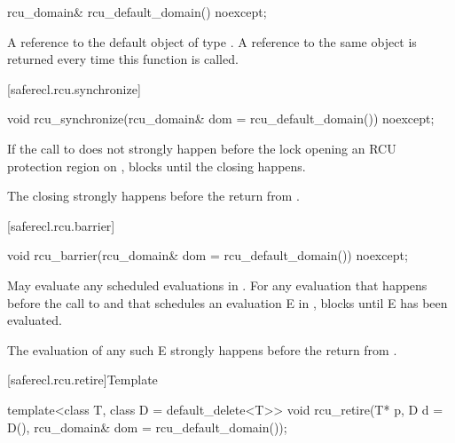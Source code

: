 \begin{itemdecl}
rcu_domain& rcu_default_domain() noexcept;
\end{itemdecl}

\begin{itemdescr}

\returns
A reference to the default object of type .
A reference to the same object is returned every time this
function is called.

\end{itemdescr}

[saferecl.rcu.synchronize]{}

\begin{itemdecl}
void rcu_synchronize(rcu_domain& dom = rcu_default_domain()) noexcept;
\end{itemdecl}

\begin{itemdescr}

\effects
If the call to  does not strongly
happen before the lock opening an RCU protection region 
on , blocks until the  closing 
happens.

\sync
The  closing  strongly
happens before the return from .

\end{itemdescr}

[saferecl.rcu.barrier]{}

\begin{itemdecl}
void rcu_barrier(rcu_domain& dom = rcu_default_domain()) noexcept;
\end{itemdecl}

\begin{itemdescr}

\effects
May evaluate any scheduled evaluations in
. For any evaluation that happens before the call
to  and that schedules an evaluation E
in , blocks until E has been evaluated.

\sync
The evaluation of any such E strongly
happens before the return from .

\end{itemdescr}

[saferecl.rcu.retire]{Template }

\begin{itemdecl}
template<class T, class D = default_delete<T>>
void rcu_retire(T* p, D d = D(), rcu_domain& dom = rcu_default_domain());
\end{itemdecl}

